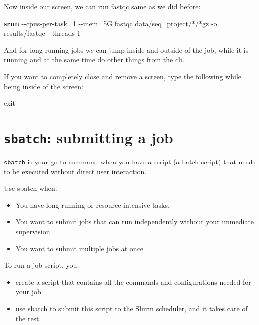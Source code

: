 \documentclass[
  letterpaper,
  DIV=11,
  numbers=noendperiod]{scrreprt}
\newenvironment{Shaded}{}{}
\newcommand{\AttributeTok}[1]{\textcolor[rgb]{0.84,0.23,0.29}{#1}}
\newcommand{\BuiltInTok}[1]{\textcolor[rgb]{0.84,0.23,0.29}{#1}}
\newcommand{\ExtensionTok}[1]{\textcolor[rgb]{0.84,0.23,0.29}{\textbf{#1}}}
\newcommand{\NormalTok}[1]{\textcolor[rgb]{0.14,0.16,0.18}{#1}}
\newcommand{\OperatorTok}[1]{\textcolor[rgb]{0.14,0.16,0.18}{#1}}
\newcommand{\PreprocessorTok}[1]{\textcolor[rgb]{0.84,0.23,0.29}{#1}}
\providecommand{\tightlist}{%
  \setlength{\itemsep}{0pt}\setlength{\parskip}{0pt}}\usepackage{longtable,booktabs,array}
\begin{document}
Now inside our screen, we can run fastqc same as we did before:

\begin{Shaded}
\begin{Highlighting}[]
\ExtensionTok{srun} \AttributeTok{{-}{-}cpus{-}per{-}task}\OperatorTok{=}\NormalTok{1 }\AttributeTok{{-}{-}mem}\OperatorTok{=}\NormalTok{5G fastqc data/seq\_project/}\PreprocessorTok{*}\NormalTok{/}\PreprocessorTok{*}\NormalTok{gz }\AttributeTok{{-}o}\NormalTok{ results/fastqc  }\AttributeTok{{-}{-}threads}\NormalTok{ 1 }
\end{Highlighting}
\end{Shaded}

And for long-running jobs we can jump inside and outside of the job,
while it is running and at the same time do other things from the cli.

If you want to completely close and remove a screen, type the following
while being inside of the screen:

\begin{Shaded}
\begin{Highlighting}[]
\BuiltInTok{exit}
\end{Highlighting}
\end{Shaded}

\section{\texorpdfstring{\texttt{sbatch}: submitting a
job}{sbatch: submitting a job}}\label{sbatch-submitting-a-job}

\texttt{sbatch} is your go-to command when you have a script (a batch
script) that needs to be executed without direct user interaction.

Use sbatch when:

\begin{itemize}
\tightlist
\item
  You have long-running or resource-intensive tasks.
\item
  You want to submit jobs that can run independently without your
  immediate supervision
\item
  You want to submit multiple jobs at once
\end{itemize}

To run a job script, you:

\begin{itemize}
\tightlist
\item
  create a script that contains all the commands and configurations
  needed for your job
\item
  use sbatch to submit this script to the Slurm scheduler, and it takes
  care of the rest.
\end{itemize}
\end{document}
